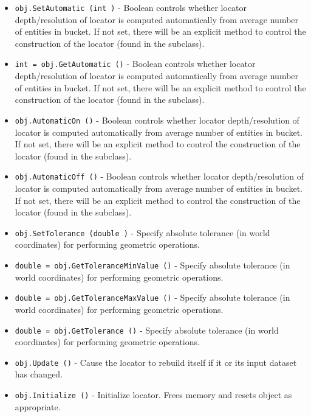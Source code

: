 \begin{itemize}
\item  \verb|obj.SetAutomatic (int )| -  Boolean controls whether locator depth/resolution of locator is computed
 automatically from average number of entities in bucket. If not set,
 there will be an explicit method to control the construction of the
 locator (found in the subclass).

\item  \verb|int = obj.GetAutomatic ()| -  Boolean controls whether locator depth/resolution of locator is computed
 automatically from average number of entities in bucket. If not set,
 there will be an explicit method to control the construction of the
 locator (found in the subclass).

\item  \verb|obj.AutomaticOn ()| -  Boolean controls whether locator depth/resolution of locator is computed
 automatically from average number of entities in bucket. If not set,
 there will be an explicit method to control the construction of the
 locator (found in the subclass).

\item  \verb|obj.AutomaticOff ()| -  Boolean controls whether locator depth/resolution of locator is computed
 automatically from average number of entities in bucket. If not set,
 there will be an explicit method to control the construction of the
 locator (found in the subclass).

\item  \verb|obj.SetTolerance (double )| -  Specify absolute tolerance (in world coordinates) for performing
 geometric operations.

\item  \verb|double = obj.GetToleranceMinValue ()| -  Specify absolute tolerance (in world coordinates) for performing
 geometric operations.

\item  \verb|double = obj.GetToleranceMaxValue ()| -  Specify absolute tolerance (in world coordinates) for performing
 geometric operations.

\item  \verb|double = obj.GetTolerance ()| -  Specify absolute tolerance (in world coordinates) for performing
 geometric operations.

\item  \verb|obj.Update ()| -  Cause the locator to rebuild itself if it or its input dataset has 
 changed.

\item  \verb|obj.Initialize ()| -  Initialize locator. Frees memory and resets object as appropriate.


\end{itemize}
